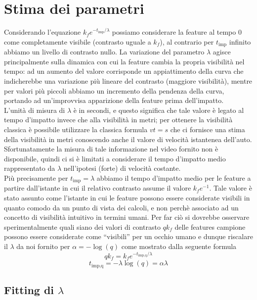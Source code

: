 \documentclass[12pt]{report}
\begin{document}
\section{Stima dei parametri}

\noindent Considerando l'equazione $k_fe^{-t_{\text{imp}}/\lambda}$ possiamo considerare la feature al tempo $0$ come completamente visibile (contrasto uguale a $k_f$), al contrario per $t_{\text{imp}}$ infinito abbiamo un livello di contrasto nullo. La variazione del parametro $\lambda$ agisce principalmente sulla dinamica con cui la feature cambia la propria visibilit\`a nel tempo: ad un aumento del valore corrisponde un appiattimento della curva che indicherebbe una variazione pi\`u lineare del contrasto (maggiore visibilit\`a), mentre per valori pi\`u piccoli abbiamo un incremento della pendenza della curva, portando ad un'improvvisa apparizione della feature prima dell'impatto. \\

\noindent L'unit\`a di misura di $\lambda$ \`e in secondi, e questo significa che tale valore \`e legato al tempo d'impatto invece che alla visibilit\`a in metri; per ottenere la visibilit\`a classica \`e possibile utilizzare la classica formula $vt=s$ che ci fornisce una stima della visibilit\`a in metri conoscendo anche il valore di velocit\`a istantenea dell'auto. Sfortunatamente la misura di tale informazione nel video fornito non \`e disponibile, quindi ci si \`e limitati a considerare il tempo d'impatto medio rappresentato da $\lambda$ nell'ipotesi (forte) di velocit\`a costante.\\

\noindent Pi\`u precisamente per $t_{\text{imp}}=\lambda$ abbiamo il tempo d'impatto medio per le feature a partire dall'istante in cui il relativo contrasto assume il valore $k_fe^{-1}$. Tale valore \`e stato assunto come l'istante in cui le feature possono essere considerate visibili in quanto comodo da un punto di vista dei calcoli, e non perch\`e associato ad un concetto di visibilit\`a intuitivo in termini umani. Per far ci\`o si dovrebbe osservare sperimentalmente quali siano dei valori di contrasto $qk_f$ delle features campione possono essere considerate come ``visibili'' per un occhio umano e dunque riscalare il $\lambda$ da noi fornito per $\alpha=-\log\left(q\right)$ come mostrato dalla seguente formula $$qk_f = k_fe^{-t_{\text{imp,q}}/\lambda}$$ $$t_{\text{imp,q}} = -\lambda\log \left(q\right) = \alpha\lambda$$


\subsection{Fitting di $\lambda$}
\label{sect:fit}
\end{document}
